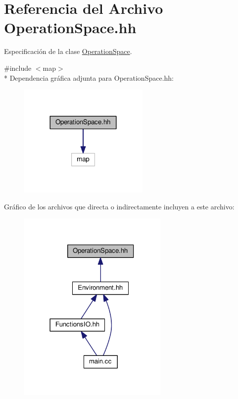 \hypertarget{_operation_space_8hh}{}\section{Referencia del Archivo Operation\+Space.\+hh}
\label{_operation_space_8hh}


Especificación de la clase \hyperlink{class_operation_space}{Operation\+Space}.  


{\ttfamily \#include $<$map$>$}\\*
Dependencia gráfica adjunta para Operation\+Space.\+hh\+:
\nopagebreak
\begin{figure}[H]
\begin{center}
\leavevmode
\includegraphics[width=180pt]{_operation_space_8hh__incl}
\end{center}
\end{figure}
Gráfico de los archivos que directa o indirectamente incluyen a este archivo\+:
\nopagebreak
\begin{figure}[H]
\begin{center}
\leavevmode
\includegraphics[width=207pt]{_operation_space_8hh__dep__incl}
\end{center}
\end{figure}
